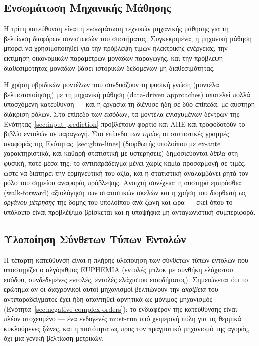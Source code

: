 \subsection{Ενσωμάτωση Μηχανικής Μάθησης}
\label{subsec:ml-integration}

Η τρίτη κατεύθυνση είναι η ενσωμάτωση τεχνικών μηχανικής μάθησης για τη βελτίωση διαφόρων συνιστωσών του συστήματος. Συγκεκριμένα, η μηχανική μάθηση μπορεί να χρησιμοποιηθεί για την πρόβλεψη τιμών ηλεκτρικής ενέργειας, την εκτίμηση οικονομικών παραμέτρων μονάδων παραγωγής, και την πρόβλεψη διαθεσιμότητας μονάδων βάσει ιστορικών δεδομένων μη διαθεσιμότητας.

Η χρήση υβριδικών μοντέλων που συνδυάζουν τη φυσική γνώση (μοντέλα βελτιστοποίησης) με τη μηχανική μάθηση (data-driven approaches) αποτελεί πολλά υποσχόμενη κατεύθυνση --- και η εργασία τη διένυσε ήδη σε δύο επίπεδα, με αυστηρή διάκριση ρόλων. Στο επίπεδο των \emph{εισόδων}, τα μοντέλα ενισχυμένων δέντρων της Ενότητας~\ref{sec:input-prediction} προβλέπουν φορτίο και ΑΠΕ και τροφοδοτούν το βιβλίο εντολών σε παραγωγή. Στο επίπεδο των \emph{τιμών}, οι στατιστικές γραμμές αναφοράς της Ενότητας~\ref{sec:gbm-lines} (διορθωτής υπολοίπου με ex-ante χαρακτηριστικά, και καθαρή στατιστική με υστερήσεις) δημοσιεύονται \emph{δίπλα} στη φυσική, ποτέ μέσα της: το αντιπαράδειγμα μένει χωρίς καμία προσαρμογή σε τιμές, ώστε να διατηρεί την ερμηνευτική του αξία, και η στατιστική αναλαμβάνει ρητά τον ρόλο του σημείου αναφοράς πρόβλεψης. Ανοιχτή συνέχεια: η αυστηρά εμπρόσθια (walk-forward) αξιολόγηση των στατιστικών σκελών και η χρήση του διορθωτή ως \emph{οργάνου μέτρησης} της δομής του υπολοίπου ανά ζώνη και ώρα --- εκεί όπου το υπόλοιπο είναι προβλέψιμο βρίσκεται και η υποψήφια μη ανταγωνιστική συμπεριφορά.

\subsection{Υλοποίηση Σύνθετων Τύπων Εντολών}
\label{subsec:complex-orders}

Η τέταρτη κατεύθυνση είναι η πλήρης υλοποίηση των σύνθετων τύπων εντολών που υποστηρίζει ο αλγόριθμος EUPHEMIA (εντολές μπλοκ με συνθήκη ελάχιστου εσόδου, συνδεδεμένες εντολές, εντολές ελάχιστου εισοδήματος). Σημειώνεται ότι το ερώτημα αν οι διαχρονικοί αυτοί μηχανισμοί βελτιώνουν την \emph{ακρίβεια} του αντιπαραδείγματος έχει ήδη απαντηθεί αρνητικά ως μόνιμος μηχανισμός (Ενότητα~\ref{sec:negative-complex-orders}): το ενδιαφέρον της κατεύθυνσης είναι πλέον στοχευμένο --- ένα ενδογενές must-run υπό χειμερινή πύλη για τις θερμικά κυκλούμενες ζώνες, και η πιστότητα ως προς τον πραγματικό μηχανισμό της αγοράς, όχι μια γενική βελτίωση μετρικών.

